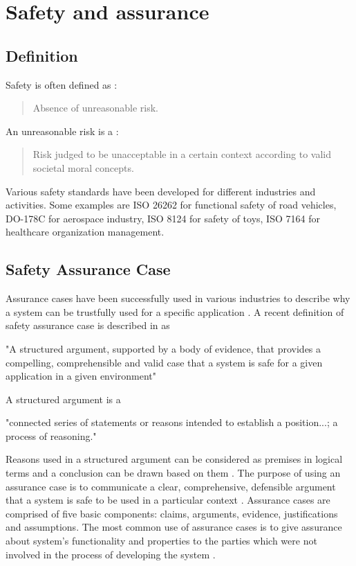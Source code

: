 \chapter{Safety and assurance}

\section{Definition}

Safety is often defined as \cite{organization2018iso}:
\begin{quotation}
Absence of unreasonable risk.
\end{quotation}  
An unreasonable risk is a \cite{organization2018iso}:
\begin{quotation}
Risk judged to be unacceptable in a certain context according to valid societal moral concepts.
\end{quotation}
Various safety standards have been developed for different industries and activities. Some examples are ISO 26262 for functional safety of road vehicles, DO-178C for aerospace industry, ISO 8124 for safety of toys, ISO 7164 for healthcare organization management.

\section{Safety Assurance Case}

Assurance cases have been successfully used in various industries to describe why a system can be trustfully used for a specific application \cite{Ashmore2021}.
A recent definition of safety assurance case is described in \cite{Bloomfield2010} as


\begin{displayquote}[][]
"A structured argument, supported by a body of evidence, that provides a compelling, comprehensible and valid case that a system is safe for a given application in a given environment"
\end{displayquote}
A structured argument is a \cite{Omg2010}
\begin{displayquote}[][]
"connected series of statements or reasons intended to establish a position...; a process of reasoning."
\end{displayquote}
Reasons used in a structured argument can be considered as premises in logical terms and a conclusion can be drawn based on them \cite{Omg2010}.  
The purpose of using an assurance case is to communicate a clear, comprehensive, defensible argument that a system is safe to be used in a particular context \cite{gsn2004Kelly}. Assurance cases are comprised of five basic components: claims, arguments, evidence, justifications and assumptions. The most common use of assurance cases is to give assurance about system's functionality and properties to the parties which were not involved in the process of developing the system \cite{iso15026-1-2019}.

